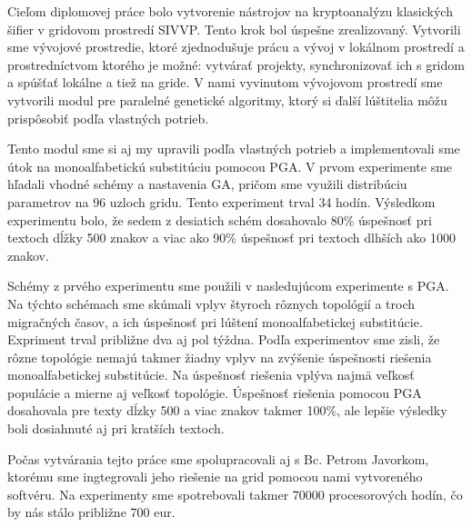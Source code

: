 
Cieľom diplomovej práce bolo vytvorenie nástrojov na kryptoanalýzu klasických šifier v gridovom prostredí SIVVP.
Tento krok bol úspešne zrealizovaný. Vytvorili sme vývojové prostredie, ktoré zjednodušuje prácu a vývoj v lokálnom prostredí
a prostredníctvom ktorého je možné: vytvárať projekty,  synchronizovať ich s gridom a spúšťať lokálne a tiež na gride.
V nami vyvinutom vývojovom prostredí sme vytvorili modul pre paralelné genetické algoritmy,
ktorý si ďalší lúštitelia môžu prispôsobiť podľa vlastných potrieb.

Tento modul sme si aj my upravili podľa vlastných potrieb a implementovali sme útok na monoalfabetickú substitúciu pomocou PGA.
V prvom experimente sme hľadali vhodné schémy a nastavenia GA, pričom sme využili distribúciu parametrov na 96 uzloch gridu.
Tento experiment trval 34 hodín. Výsledkom experimentu bolo, že sedem z desiatich schém dosahovalo 80\% úspešnosť pri textoch
dĺžky 500 znakov a viac ako 90\% úspešnosť pri textoch dlhších ako 1000 znakov.

Schémy z prvého experimentu sme použili v nasledujúcom experimente s PGA.
Na týchto schémach sme skúmali vplyv štyroch rôznych topológií a troch migračných časov, a ich úspešnosť pri lúštení
monoalfabetickej substitúcie.
Expriment trval približne dva aj pol týždna.
Podľa experimentov sme zisli, že rôzne topológie nemajú takmer žiadny vplyv na zvýšenie úspešnosti riešenia monoalfabetickej substitúcie.
Na úspešnosť riešenia vplýva najmä veľkosť populácie a mierne aj veľkosť topológie.     
Úspešnosť riešenia pomocou PGA dosahovala pre texty dĺzky 500 a viac znakov takmer 100\%, ale lepšie výsledky boli dosiahnuté aj pri kratších textoch.

Počas vytvárania tejto práce sme spolupracovali aj s Bc. Petrom Javorkom, ktorému sme ingtegrovali jeho riešenie na grid pomocou nami vytvoreného softvéru.
Na experimenty sme spotrebovali takmer 70000 procesorových hodín, čo by nás stálo približne 700 eur.

